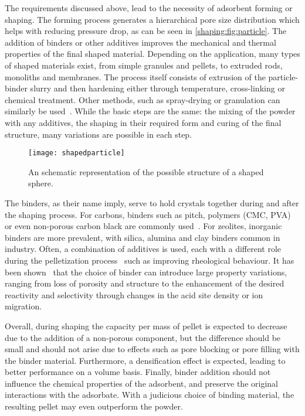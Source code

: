 The requirements discussed above, lead to the necessity of adsorbent
forming or shaping. The forming process generates a hierarchical pore size 
distribution which helps with reducing pressure drop, as can be
seen in \autoref{shaping:fig:particle}. The addition of 
binders or other additives improves the mechanical and thermal
properties of the final shaped material. Depending on the application,
many types of shaped materials exist, from simple granules and 
pellets, to extruded rods, monoliths and membranes.
The process itself consists of extrusion of the particle-binder slurry 
and then hardening either through temperature, cross-linking
or chemical treatment. Other methods, such as spray-drying or 
granulation can similarly be 
used~\cite{ruthvenPrinciplesAdsorptionAdsorption1984}.
While the basic steps are the same: the mixing of the powder with any
additives, the shaping in their required form and curing of the final
structure, many variations are possible in each step.

\begin{figure}[!htb]
	\centering
	\texttt{[image: shapedparticle]}
	\caption{An schematic representation of the possible structure
	of a shaped sphere.}%
	\label{shaping:fig:particle}
\end{figure}

The binders, as their name imply, serve to hold crystals together
during and after the shaping process.
For carbons, binders such as pitch, polymers (CMC, \gls{PVA}) or 
even non-porous carbon black are 
commonly used~\cite{ohjiAdvancedProcessingManufacturing2008}.
For zeolites, inorganic binders are more prevalent, with silica, 
alumina and clay binders common in industry. 
Often, a combination of additives is used, each with a different role 
during the pelletization process~\cite{bandoszActivatedCarbonSurfaces2006}
such as improving rheological behaviour. It has been 
shown~\cite{whitingcuriouscasezeolite2016, MichelsEffectsBindersPerformance2014}
that the choice of binder can introduce large property variations, ranging 
from loss of porosity and structure to the enhancement of the desired
reactivity and selectivity through changes in the acid site density 
or ion migration.

Overall, during shaping the capacity per mass of pellet is expected to 
decrease due to the addition of a non-porous component, but the
difference should be small and should not arise due to effects 
such as pore blocking or pore filling with the binder material.
Furthermore, a densification effect is expected, leading to
better performance on a volume basis.
Finally, binder addition should not influence the chemical properties 
of the adsorbent, and preserve the original interactions with the adsorbate.
With a judicious choice of binding material, the resulting pellet
may even outperform the powder.

